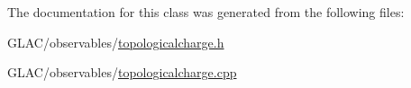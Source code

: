 The documentation for this class was generated from the following files\+:\begin{DoxyCompactItemize}
\item 
G\+L\+A\+C/observables/\mbox{\hyperlink{topologicalcharge_8h}{topologicalcharge.\+h}}\item 
G\+L\+A\+C/observables/\mbox{\hyperlink{topologicalcharge_8cpp}{topologicalcharge.\+cpp}}\end{DoxyCompactItemize}
